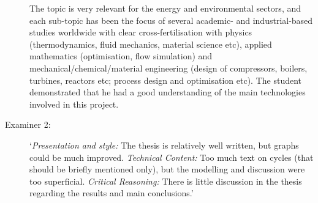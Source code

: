 \documentclass[14pt,twoside]{report}
\begin{document}
\begin{description}
The topic is very relevant for the energy and environmental sectors, and each sub-topic has been the focus of several academic- and industrial-based studies worldwide with clear cross-fertilisation with physics (thermodynamics, fluid mechanics, material science etc), applied mathematics (optimisation, flow simulation) and mechanical/chemical/material engineering (design of compressors, boilers, turbines, reactors etc; process design and optimisation etc). The student demonstrated that he had a good understanding of the main technologies involved in this project.

\item[Examiner 2:] `{\it Presentation and style:} The thesis is relatively well written, but graphs could be much improved. {\it Technical Content:} Too much text on cycles (that should be briefly mentioned only), but the modelling and discussion were too superficial. {\it Critical Reasoning:} There is little discussion in the thesis regarding the results and main conclusions.' 

\end{description}

\clearpage



\bigskip
\end{document}
